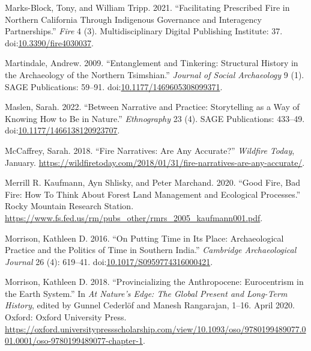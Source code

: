 \documentclass[
]{article}
\newlength{\cslhangindent}
\newenvironment{CSLReferences}[2] %
 {\begin{list}{}{%
  \setlength{\itemindent}{0pt}
  \setlength{\leftmargin}{0pt}
  \setlength{\parsep}{0pt}
  \ifodd #1
   \setlength{\leftmargin}{\cslhangindent}
   \setlength{\itemindent}{-1\cslhangindent}
  \fi
  \setlength{\itemsep}{#2\baselineskip}}}
 {\end{list}}
\begin{document}
\begin{CSLReferences}{1}{0}
Marks-Block, Tony, and William Tripp. 2021. {``Facilitating {Prescribed Fire} in {Northern California} Through {Indigenous Governance} and {Interagency Partnerships}.''} \emph{Fire} 4 (3). Multidisciplinary Digital Publishing Institute: 37. doi:\href{https://doi.org/10.3390/fire4030037}{10.3390/fire4030037}.

Martindale, Andrew. 2009. {``Entanglement and Tinkering: {Structural} History in the Archaeology of the {Northern Tsimshian}.''} \emph{Journal of Social Archaeology} 9 (1). SAGE Publications: 59--91. doi:\href{https://doi.org/10.1177/1469605308099371}{10.1177/1469605308099371}.

Maslen, Sarah. 2022. {``Between Narrative and Practice: {Storytelling} as a Way of Knowing How to Be in Nature.''} \emph{Ethnography} 23 (4). SAGE Publications: 433--49. doi:\href{https://doi.org/10.1177/1466138120923707}{10.1177/1466138120923707}.

McCaffrey, Sarah. 2018. {``Fire {Narratives}: {Are Any Accurate}?''} \emph{Wildfire Today}, January. \url{https://wildfiretoday.com/2018/01/31/fire-narratives-are-any-accurate/}.

Merrill R. Kaufmann, Ayn Shlisky, and Peter Marchand. 2020. {``Good {Fire}, {Bad Fire}: {How To Think About Forest Land Management} and {Ecological Processes}.''} Rocky Mountain Research Station. \url{https://www.fs.fed.us/rm/pubs_other/rmrs_2005_kaufmann001.pdf}.

Morrison, Kathleen D. 2016. {``On {Putting Time} in Its {Place}: {Archaeological Practice} and the {Politics} of {Time} in {Southern India}.''} \emph{Cambridge Archaeological Journal} 26 (4): 619--41. doi:\href{https://doi.org/10.1017/S0959774316000421}{10.1017/S0959774316000421}.

Morrison, Kathleen D. 2018. {``Provincializing the {Anthropocene}: {Eurocentrism} in the {Earth System}.''} In \emph{At {Nature}'s {Edge}: {The Global Present} and {Long-Term History}}, edited by Gunnel Cederlöf and Manesh Rangarajan, 1--16. April 2020. Oxford: Oxford University Press. \url{https://oxford.universitypressscholarship.com/view/10.1093/oso/9780199489077.001.0001/oso-9780199489077-chapter-1}.


\end{CSLReferences}
\end{document}

